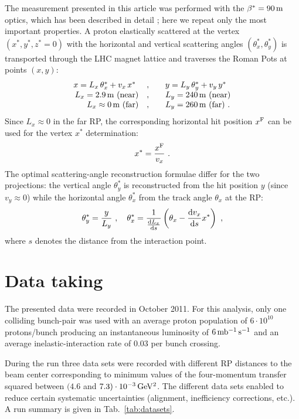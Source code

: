 \documentclass[doublecol]{epl/epl2}
\def\d{{\rm d}}
\def\un#1{\,{\rm #1}}
\begin{document}
The measurement presented in this article was performed with the $\beta^*=90\un{m}$ optics, which has been described in detail \cite{epl96}; here we repeat only the most important properties. A proton elastically scattered at the vertex $(x^*, y^*, z^*=0)$ with the horizontal and vertical scattering angles $(\theta_x^*, \theta_y^*)$ is transported through the LHC magnet lattice and traverses the Roman Pots at points $(x, y)$:
\begin{equation}
\label{eq:transport}
\begin{array}{rcl}
x = L_x\,\theta^*_x + v_x\,x^*\ &,\quad& y = L_y\,\theta^*_y + v_y\,y^* \\
L_x = 2.9\un{m} \hbox{ (near)}&,\quad& L_y = 240\un{m} \hbox{ (near)}\\
L_x \approx 0\un{m} \hbox{ (far)}&,\quad& L_y = 260\un{m}\hbox{ (far)}\ .\\
\end{array}
\end{equation}
Since $L_x \approx 0$ in the far RP, the corresponding horizontal hit position $x^{\rm F}$ can be used for the vertex $x^*$ determination:
\begin{equation}
\label{eq:vertex reconstruction}
x^* = {x^{\rm F}\over v_x}\ .
\end{equation}
The optimal scattering-angle reconstruction formulae differ for the two projections: the vertical angle $\theta^*_y$ is reconstructed from the hit position $y$ (since $v_y\approx 0$) while the horizontal angle $\theta^*_x$ from the track angle $\theta_x$ at the RP:
\begin{equation}
\label{eq:theta reconstruction}
\theta^*_y = {y\over L_y}\ ,\quad
\theta^*_x = {1\over {\d L_x\over \d s}} \left( \theta_x - {\d v_x\over \d s} x^* \right)\ ,
\end{equation}
where $s$ denotes the distance from the interaction point.


\section{Data taking}

The presented data were recorded in October 2011. For this analysis, only one colliding bunch-pair was used with an average proton population of $6\cdot10^{10}$ protons/bunch producing an instantaneous luminosity of $6\un{mb^{-1}\, s^{-1}}$ and an average inelastic-interaction rate of $0.03$ per bunch crossing.

During the run three data sets were recorded with different RP distances to the beam center corresponding to minimum values of the four-momentum transfer squared between $(4.6$ and $7.3)\cdot10^{-3}\un{GeV^2}$. The different data sets enabled to reduce certain systematic uncertainties (alignment, inefficiency corrections, etc.). A run summary is given in Tab.~\ref{tab:datasets}.
\end{document}
